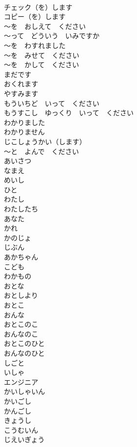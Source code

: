 \documentclass[8pt]{extreport}
\begin{document}
\begin{CJK}{UTF8}{min}
\\	チェック（を）します	
\\	コピー（を）します	
\\	～を　おしえて　ください	
\\	～って　どういう　いみですか	
\\	～を　わすれました	
\\	～を　みせて　ください	
\\	～を　かして　ください	
\\	まだです	
\\	おくれます	
\\	やすみます	
\\	もういちど　いって　ください	
\\	もうすこし　ゆっくり　いって　ください	
\\	わかりました	
\\	わかりません	
\\	じこしょうかい（します）	
\\	～と　よんで　ください	
\\	あいさつ	
\\	なまえ	
\\	めいし	
\\	ひと	
\\	わたし	
\\	わたしたち	
\\	あなた	
\\	かれ	
\\	かのじょ	
\\	じぶん	
\\	あかちゃん	
\\	こども	
\\	わかもの	
\\	おとな	
\\	おとしより	
\\	おとこ	
\\	おんな	
\\	おとこのこ	
\\	おんなのこ	
\\	おとこのひと	
\\	おんなのひと	
\\	しごと	
\\	いしゃ	
\\	エンジニア	
\\	かいしゃいん	
\\	かいごし	
\\	かんごし	
\\	きょうし	
\\	こうむいん	
\\	じえいぎょう	

\end{CJK}
\end{document}
